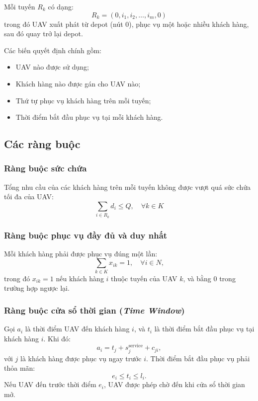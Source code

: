 \documentclass{article}
\begin{document}
Mỗi tuyến $R_k$ có dạng:
\begin{equation}
    R_k = (0, i_{1}, i_{2}, \dots, i_{m}, 0)
\end{equation}
trong đó UAV xuất phát từ depot (nút $0$), phục vụ một hoặc nhiều khách hàng, sau đó quay trở lại depot. 

Các biến quyết định chính gồm:
\begin{itemize}
    \item UAV nào được sử dụng;
    \item Khách hàng nào được gán cho UAV nào;
    \item Thứ tự phục vụ khách hàng trên mỗi tuyến;
    \item Thời điểm bắt đầu phục vụ tại mỗi khách hàng.
\end{itemize}

\subsection{Các ràng buộc}

\subsubsection{Ràng buộc sức chứa}
Tổng nhu cầu của các khách hàng trên mỗi tuyến không được vượt quá sức chứa tối đa của UAV:
\begin{equation}
    \sum_{i \in R_k} d_i \le Q, \quad \forall k \in K
\end{equation}

\subsubsection{Ràng buộc phục vụ đầy đủ và duy nhất}
Mỗi khách hàng phải được phục vụ đúng một lần:
\begin{equation}
    \sum_{k \in K} x_{ik} = 1, \quad \forall i \in N,
\end{equation}
trong đó $x_{ik} = 1$ nếu khách hàng $i$ thuộc tuyến của UAV $k$, và bằng $0$ trong trường hợp ngược lại.

\subsubsection{Ràng buộc cửa sổ thời gian (\textit{Time Window})}
Gọi $a_i$ là thời điểm UAV đến khách hàng $i$, và $t_i$ là thời điểm bắt đầu phục vụ tại khách hàng $i$. Khi đó:
\begin{equation}
    a_i = t_j + s_j^{\text{service}} + c_{ji},
\end{equation}
với $j$ là khách hàng được phục vụ ngay trước $i$. Thời điểm bắt đầu phục vụ phải thỏa mãn:
\begin{equation}
    e_i \le t_i \le l_i.
\end{equation}
Nếu UAV đến trước thời điểm $e_i$, UAV được phép chờ đến khi cửa sổ thời gian mở.
\end{document}
